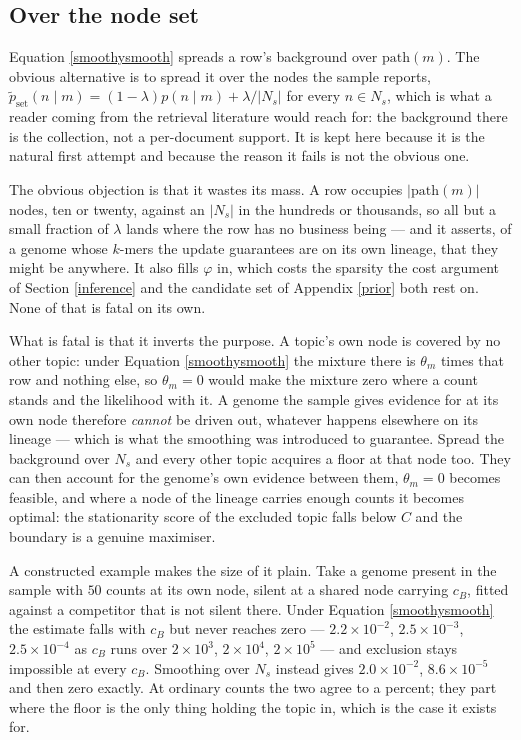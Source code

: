 \documentclass[pdflatex,sn-vancouver-num]{sn-jnl}
\begin{document}
\begin{appendices}
    \subsection{Over the node set}\label{nodesmoothset}
    Equation \eqref{smoothysmooth} spreads a row's background over $\mathrm{path}(m)$. The obvious
    alternative is to spread it over the nodes the sample reports,
    $\tilde{p}_{\mathrm{set}}(n \mid m) = (1 - \lambda) p(n \mid m) + \lambda / \lvert N_s \rvert$
    for every $n \in N_s$, which is what a reader
    coming from the retrieval literature would reach for: the background there is the collection, not
    a per-document support. It is kept here because it is the natural first attempt and because the
    reason it fails is not the obvious one.

    The obvious objection is that it wastes its mass. A row occupies $\lvert \mathrm{path}(m) \rvert$
    nodes, ten or twenty, against an $\lvert N_s \rvert$ in the hundreds or thousands, so all but a
    small fraction of $\lambda$ lands where the row has no business being --- and it asserts, of a
    genome whose $k$-mers the update guarantees are on its own lineage, that they might be anywhere.
    It also fills $\varphi$ in, which costs the sparsity the cost argument of
    Section \ref{inference} and the candidate set of Appendix \ref{prior} both rest on. None of that
    is fatal on its own.

    What is fatal is that it inverts the purpose. A topic's own node is covered by no other topic:
    under Equation \eqref{smoothysmooth} the mixture there is $\theta_m$ times that row and nothing
    else, so $\theta_m = 0$ would make the mixture zero where a count stands and the likelihood with
    it. A genome the sample gives evidence for at its own node therefore \emph{cannot} be driven out,
    whatever happens elsewhere on its lineage --- which is what the smoothing was introduced to
    guarantee. Spread the background over $N_s$ and every other topic acquires a floor at that node
    too. They can then account for the genome's own evidence between them, $\theta_m = 0$ becomes
    feasible, and where a node of the lineage carries enough counts it becomes optimal: the
    stationarity score of the excluded topic falls below $C$ and the boundary is a genuine maximiser.

    A constructed example makes the size of it plain. Take a genome present in the sample with $50$
    counts at its own node, silent at a shared node carrying $c_B$, fitted against a competitor that
    is not silent there. Under Equation \eqref{smoothysmooth} the estimate falls with $c_B$ but never
    reaches zero --- $2.2 \times 10^{-2}$, $2.5 \times 10^{-3}$, $2.5 \times 10^{-4}$ as $c_B$ runs
    over $2 \times 10^3$, $2 \times 10^4$, $2 \times 10^5$ --- and exclusion stays impossible at
    every $c_B$. Smoothing over $N_s$ instead gives $2.0 \times 10^{-2}$, $8.6 \times 10^{-5}$ and
    then zero exactly. At ordinary counts the two agree to a percent; they part where the floor is
    the only thing holding the topic in, which is the case it exists for.


\end{appendices}
\end{document}

